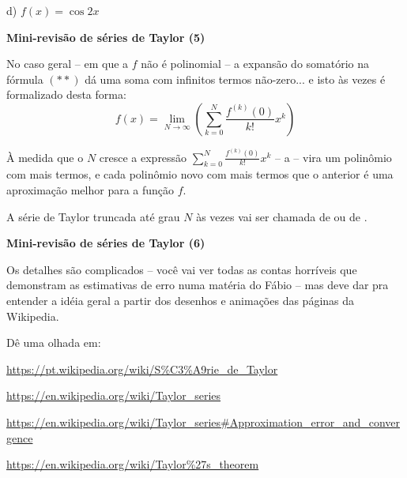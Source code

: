 \documentclass[oneside,12pt]{article}
\begin{document}
d) $f(x) = \cos 2x$



\newpage


{\bf Mini-revisão de séries de Taylor (5)}

\ssk

No caso geral -- em que a $f$ não é polinomial -- a expansão do
somatório na fórmula $(**)$ dá uma soma com infinitos termos
não-zero... e isto às vezes é formalizado desta forma:
%
$$f(x) = \displaystyle \lim_{N→∞} \left(\sum_{k=0}^N \frac{f^{(k)}(0)}{k!} x^k\right)$$

À medida que o $N$ cresce a expressão $\sum_{k=0}^N
\frac{f^{(k)}(0)}{k!} x^k$ -- a  -- vira um polinômio com mais termos, e
cada polinômio novo com mais termos que o anterior é uma aproximação
melhor para a função $f$.

\msk

A série de Taylor truncada até grau $N$ às vezes vai ser chamada de
 ou de .



\newpage


{\bf Mini-revisão de séries de Taylor (6)}

\ssk

Os detalhes são  complicados -- você vai ver todas as
contas horríveis que demonstram as estimativas de erro numa matéria do
Fábio -- mas deve dar pra entender a idéia geral a partir dos desenhos
e animações das páginas da Wikipedia.

Dê uma olhada em:

\ssk


\url{https://pt.wikipedia.org/wiki/S\%C3\%A9rie_de_Taylor}

\url{https://en.wikipedia.org/wiki/Taylor_series}

\url{https://en.wikipedia.org/wiki/Taylor_series\#Approximation_error_and_convergence}

\url{https://en.wikipedia.org/wiki/Taylor\%27s_theorem}
\end{document}
